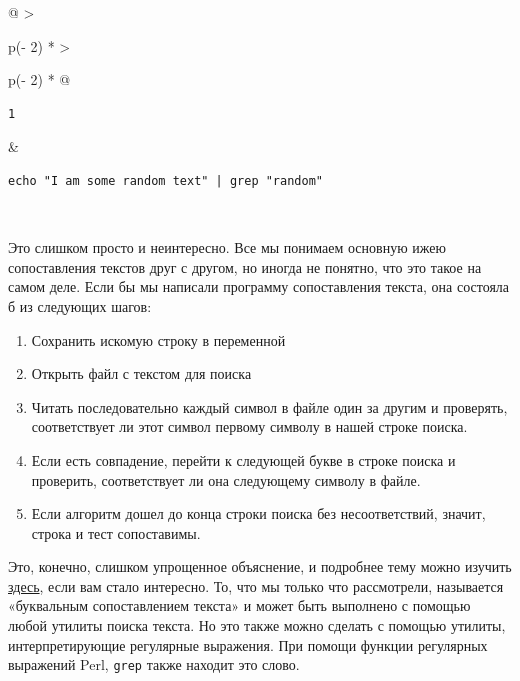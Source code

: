 \documentclass{report}
\begin{document}
\begin{longtable}[]{@{}
  >{\raggedright\arraybackslash}p{(\columnwidth - 2\tabcolsep) * }
  >{\raggedright\arraybackslash}p{(\columnwidth - 2\tabcolsep) * }@{}}
\toprule
\endhead
\begin{minipage}[t]{\linewidth}\raggedright
\begin{verbatim}
1
\end{verbatim}
\end{minipage} & \begin{minipage}[t]{\linewidth}\raggedright
\begin{verbatim}
echo "I am some random text" | grep "random"
\end{verbatim}
\end{minipage} \\ \addlinespace
\bottomrule
\end{longtable}

Это слишком просто и неинтересно. Все мы понимаем основную ижею
сопоставления текстов друг с другом, но иногда не понятно, что это такое
на самом деле. Если бы мы написали программу сопоставления текста, она
состояла б из следующих шагов:

\begin{enumerate}
\tightlist
\item
  Сохранить искомую строку в переменной
\item
  Открыть файл с текстом для поиска
\item
  Читать последовательно каждый символ в файле один за другим и
  проверять, соответствует ли этот символ первому символу в нашей строке
  поиска.
\item
  Если есть совпадение, перейти к следующей букве в строке поиска и
  проверить, соответствует ли она следующему символу в файле.
\item
  Если алгоритм дошел до конца строки поиска без несоответствий, значит,
  строка и тест сопоставимы.
\end{enumerate}

Это, конечно, слишком упрощенное объяснение, и подробнее тему можно
изучить \href{https://stackoverflow.com/a/1627904/7437737}{здесь}, если
вам стало интересно. То, что мы только что рассмотрели, называется
«буквальным сопоставлением текста» и может быть выполнено с помощью
любой утилиты поиска текста. Но это также можно сделать с помощью
утилиты, интерпретирующие регулярные выражения. При помощи функции
регулярных выражений Perl, \texttt{grep} также находит это слово.
\end{document}
